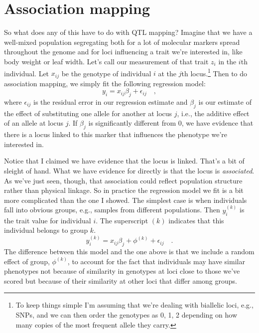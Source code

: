 \documentclass[12pt]{article}
\begin{document}
\section*{Association mapping}

So what does any of this have to do with QTL mapping? Imagine that we
have a well-mixed population segregating both for a lot of molecular
markers spread throughout the genome and for loci influencing a trait
we're interested in, like body weight or leaf width. Let's call our
measurement of that trait $z_i$ in the $i$th individual. Let $x_{ij}$
be the genotype of individual $i$ at the $j$th locus.\footnote{To keep
  things simple I'm assuming that we're dealing with biallelic loci,
  e.g., SNPs, and we can then order the genotypes as 0, 1, 2 depending
  on how many copies of the most frequent allele they carry.} Then to
do association mapping, we simply fit the following regression model:
\[
y_i = x_{ij}\beta_j + \epsilon_{ij} \quad ,
\]
where $\epsilon_{ij}$ is the residual error in our regression estimate
and $\beta_j$ is our estimate of the effect of substituting one allele
for another at locus $j$, i.e., the additive effect of an allele at
locus $j$. If $\beta_j$ is significantly different from 0, we have
evidence that there is a locus linked to this marker that influences
the phenotype we're interested in.

Notice that I claimed we have evidence that the locus is
linked. That's a bit of sleight of hand. What we have evidence for
directly is that the locus is {\it associated}. As we've just seen,
though, that association could reflect population structure rather
than physical linkage. So in practice the regression model we fit is a
bit more complicated than the one I showed. The simplest case is when
individuals fall into obvious groups, e.g., samples from different
populations. Then $y_i^{(k)}$ is the trait value for individual
$i$. The superscript $(k)$ indicates that this individual belongs to
group $k$.
\[
y_i^{(k)} = x_{ij}\beta_j + \phi^{(k)} + \epsilon_{ij} \quad .
\]
The difference between this model and the one above is that we include
a random effect of group, $\phi^{(k)}$, to account for the fact that
individuals may have similar phenotypes not because of similarity in
genotypes at loci close to those we've scored but because of their
similarity at other loci that differ among groups.




\ccLicense
\end{document}
